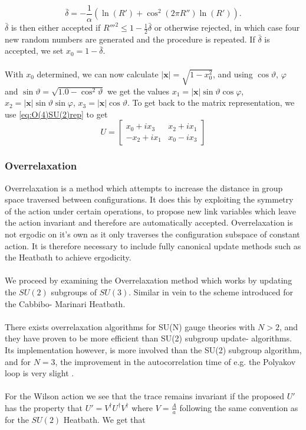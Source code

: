 \documentclass[a4paper,10pt]{article}
\begin{document}
\begin{equation}
\bar{\delta} = -\frac{1}{\alpha}\left(\ln \left(R'\right)+\cos ^{2}\left(2 \pi R''\right) \ln \left(R'\right)\right).
\end{equation}
$\bar{\delta}$ is then either accepted if 
$R'''^2 \leq 1-\frac{1}{2}\bar{\delta}$ or otherwise rejected, in which case four new random numbers are generated and the procedure is repeated. If $\bar{\delta}$ is accepted, we set $x_0 = 1-\bar{\delta}$.\\\\With $x_0$ determined, we can now calculate $|\mathbf{x}| = \sqrt{1-x_0^2}$, and using $\cos \vartheta$, $\varphi$ and $\sin \vartheta = \sqrt{1.0-\cos^2 \vartheta}$ we get the values $x_1 = |\mathbf{x}|\sin \vartheta \cos\varphi$, $x_2 = |\mathbf{x}|\sin \vartheta \sin\varphi$, $x_3 = |\mathbf{x}|\cos \vartheta$. To get back to the matrix representation, we use \eqref{eq:O(4)SU(2)rep} to get
\begin{equation}
U=\left[\begin{array}{ll}
x_0+ix_3 & x_2+ix_1 \\
-x_2+ix_1 & x_0-ix_3
\end{array}\right]
\end{equation}
\subsubsection{Overrelaxation}
Overrelaxation is a method which attempts to increase the distance in group space traversed between configurations. It does this by exploiting the symmetry of the action under certain operations, to propose new link variables which leave the action invariant and therefore are automatically accepted.
Overrelaxation is not ergodic on it's own as it only traverses the configuration subspace of constant action. It is therefore necessary to include fully canonical update methods such as the Heatbath to achieve ergodicity.\\\\We proceed by examining the Overrelaxation method which works by updating the $SU(2)$ subgroups of $SU(3)$. Similar in vein to the scheme introduced for the Cabbibo- Marinari Heatbath.\\\\There exists overrelaxation algorithms for SU(N) gauge theories with $N>2$, and they have proven to be more efficient than SU(2) subgroup update- algorithms. Its implementation however, is more involved than the SU(2) subgroup algorithm, and for $N=3$, the improvement in the autocorrelation time of e.g. the Polyakov loop is very slight \cite{inbook}.\\\\For the Wilson action we see that the trace remains invariant if the proposed $U'$ has the property that $U' = V^\dagger U^\dagger V^\dagger$ where $V = \frac{A}{a}$ following the same convention as for the $SU(2)$ Heatbath. We get that
\end{document}
